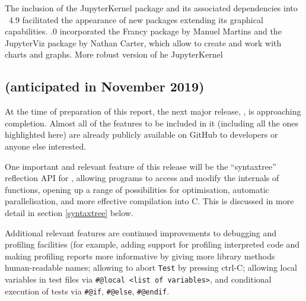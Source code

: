 \documentclass{deliverablereport}
\begin{document}
The inclusion of the {\sf JupyterKernel} package and its associated 
dependencies into \GAP~4.9 facilitated the appearance of new packages
extending its graphical capabilities. .0 incorporated 
the {\sf Francy} package \cite{Francy} by Manuel Martins and
the {\sf JupyterViz} package \cite{JupyterViz} by Nathan Carter, which
allow to create and work with charts and graphs. More robust version
of he {\sf JupyterKernel}



\subsection{ (anticipated in November 2019)}\label{gap-4.11}



At the time of preparation of this report, the next major release,  , is approaching completion. Almost all of the features to be
included in it (including all the ones highlighted here) are already
publicly  available on GitHub to developers or anyone else interested.

One important and relevant feature of this release will be the ``syntaxtree'' reflection
API for \GAP, allowing \GAP programs to access and modify the internals of \GAP
functions, opening up a range of possibilities for optimisation, automatic
parallelisation, and more effective compilation into C. This is
discussed in more detail in section \ref{syntaxtree} below. 

Additional relevant features are continued improvements to debugging and
profiling facilities (for example,
adding support for profiling interpreted code
and 
making profiling reports more informative by 
giving more library methods human-readable names;
allowing to abort \verb|Test| by pressing ctrl-C;
allowing local variables in test files via
\verb|#@local <list of variables>|,
and conditional execution of tests via \verb|#@if|, \verb|#@else|, \verb|#@endif|.
\end{document}
